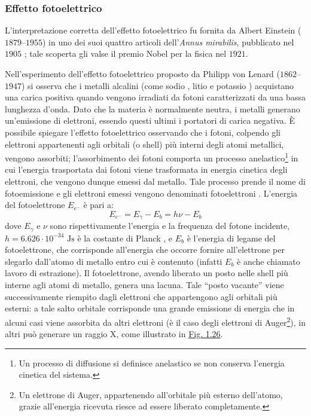 \documentclass[12pt,a4paper,twoside]{report}
\begin{document}
	\subsubsection{Effetto fotoelettrico}\label{par:effetto_fotoelettrico}
	L'interpretazione corretta dell'effetto fotoelettrico fu fornita da Albert Einstein ($1879$--$1955$) in uno dei suoi quattro articoli dell'\textit{Annus mirabilis}, pubblicato nel $1905$ \cite{Einstein1905-in}; tale scoperta gli valse il premio Nobel per la fisica nel $1921$.
	
	Nell'esperimento dell'effetto fotoelettrico proposto da Philipp von Lenard ($1862$--$1947$) si osserva che i metalli alcalini (come sodio , litio  e potassio ) acquistano una carica positiva quando vengono irradiati da fotoni caratterizzati da una bassa lunghezza d'onda. Dato che la materia è normalmente neutra, i metalli generano un'emissione di elettroni, essendo questi ultimi i portatori di carica negativa. \`E possibile spiegare l'effetto fotoelettrico osservando che i fotoni, colpendo gli elettroni appartenenti agli orbitali (o shell) più interni degli atomi metallici, vengono assorbiti; l'assorbimento dei fotoni comporta un processo anelastico\footnote{Un processo di diffusione si definisce anelastico se non conserva l'energia cinetica del sistema.} in cui l'energia trasportata dai fotoni viene trasformata in energia cinetica degli elettroni, che vengono dunque emessi dal metallo. Tale processo prende il nome di fotoemissione e gli elettroni emessi vengono denominati fotoelettroni \cite{zucchiniNotes}. L'energia del fotoelettrone $E_{e^-}$ è pari a:
	\begin{equation}
		E_{e^-}=E_\gamma-E_b=h\nu-E_b
		\label{eq:fotoelettrico}
	\end{equation}
	dove $E_\gamma$ e $\nu$ sono rispettivamente l'energia e la frequenza del fotone incidente, $h=6.626\cdot 10^{-34}\mbox{ Js}$ è la costante di Planck \cite{planckConstant}, e $E_b$ è l'energia di legame del fotoelettrone, che corrisponde all'energia che occorre fornire all'elettrone per slegarlo dall'atomo di metallo entro cui è contenuto (infatti $E_b$ è anche chiamato lavoro di estrazione). Il fotoelettrone, avendo liberato un posto nelle shell più interne agli atomi di metallo, genera una lacuna. Tale ``posto vacante'' viene successivamente riempito dagli elettroni che appartengono agli orbitali più esterni: a tale salto orbitale corrisponde una grande emissione di energia che in alcuni casi viene assorbita da altri elettroni (è il caso degli elettroni di Auger\footnote{Un elettrone di Auger, appartenendo all'orbitale più esterno dell'atomo, grazie all'energia ricevuta riesce ad essere liberato completamente.}), in altri può generare un raggio X, come illustrato in \hyperref[fig:fotoelettrico]{Fig. 1.26}.
\end{document}
